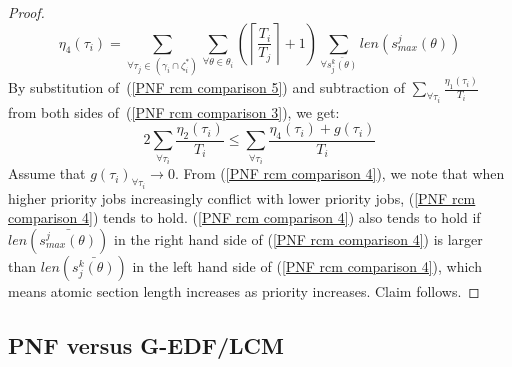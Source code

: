 \begin{proof}
\begin{equation*}
\eta_{4}(\tau_{i})=\sum_{\forall\tau_{j}\in(\gamma_{i}\cap\zeta_{i}^{*})}\sum_{\forall\theta\in\theta_{i}}\left(\left\lceil \frac{T_{i}}{T_{j}}\right\rceil +1\right)\sum_{\forall\bar{s_{j}^{k}(\theta)}}len\left(s_{max}^{j}(\theta)\right)
\end{equation*}
%
By substitution of~(\ref{PNF rcm comparison 5}) and subtraction of $\sum_{\forall \tau_i} \frac{\eta_1 (\tau_i)}{T_i}$ from both sides of~(\ref{PNF rcm comparison 3}), we get:
%
\begin{equation}
2\sum_{\forall\tau_{i}}\frac{\eta_{2}(\tau_{i})}{T_{i}}\le\sum_{\forall\tau_{i}}\frac{\eta_{4}(\tau_{i})+g(\tau_{i})}{T_{i}}
\label{PNF rcm comparison 4}
\end{equation}
%
Assume that $g(\tau_{i})_{\forall\tau_{i}}\rightarrow0$. From (\ref{PNF rcm comparison 4}), we note that when higher priority jobs increasingly conflict with lower priority jobs, (\ref{PNF rcm comparison 4}) tends to hold. (\ref{PNF rcm comparison 4}) also tends to hold if $len(\bar{s_{max}^j(\theta)})$ in the right hand side of (\ref{PNF rcm comparison 4}) is larger than $len(\bar{s_j^k(\theta)})$ in the left hand side of (\ref{PNF rcm comparison 4}), which means atomic section length increases as priority increases. Claim follows.
\end{proof}

\subsection{PNF versus G-EDF/LCM}

